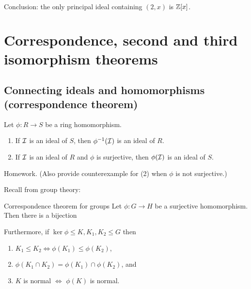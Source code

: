 \documentclass[12pt,letterpaper]{report}
\begin{document}
Conclusion: the only principal ideal containing $(2, x)$ is $\mathbb{Z}[x]$.

\section{Correspondence, second and third isomorphism theorems}

\subsection{Connecting ideals and homomorphisms (correspondence theorem)}

\begin{prop}{}{}
  Let $\phi \colon R \to S$ be a ring homomorphism.
  \begin{enumerate}
    \item If $\mathcal{I}$ is an ideal of $S$, then $\phi^{-1}(\mathcal{I})$ is an ideal of $R$.
    \item If $\mathcal{I}$ is an ideal of $R$ and $\phi$ is surjective, then $\phi(\mathcal{I})$ is an ideal
      of $S$.
  \end{enumerate}
\end{prop}

\begin{thmproof}
  Homework.
  (Also provide counterexample for (2) when $\phi$ is not surjective.)
\end{thmproof}

Recall from group theory:

\begin{thm}{Correspondence theorem for groups}{}
  Let $\phi \colon G \to H$ be a surjective homomorphism.
  Then there is a bijection
  \begin{center}
  \end{center}
  Furthermore, if $\ker\phi \leq K, K_1, K_2 \leq G$ then
  \begin{enumerate}
    \item $K_1 \leq K_2 \iff \phi(K_1) \leq \phi(K_2)$,
    \item $\phi(K_1 \cap K_2) = \phi(K_1) \cap \phi(K_2)$, and
    \item $K$ is normal $\iff$ $\phi(K)$ is normal.
  \end{enumerate}
\end{thm}
\end{document}
